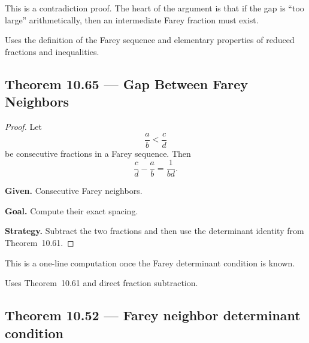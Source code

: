 \begin{remark*}
This is a contradiction proof.  The heart of the argument is that if the gap is
``too large'' arithmetically, then an intermediate Farey fraction must exist.
\end{remark*}

\begin{remark*}[Dependencies]
Uses the definition of the Farey sequence and elementary properties of reduced
fractions and inequalities.
\end{remark*}


\subsection*{Theorem 10.65 — Gap Between Farey Neighbors}
\label{prf:grep-farey-gap}

\begin{proof}
\Claim Let
\[
\frac{a}{b} < \frac{c}{d}
\]
be consecutive fractions in a Farey sequence. Then
\[
\frac{c}{d} - \frac{a}{b} = \frac{1}{bd}.
\]

\textbf{Given.} Consecutive Farey neighbors.

\textbf{Goal.} Compute their exact spacing.

\textbf{Strategy.} Subtract the two fractions and then use the determinant identity from Theorem~10.61.


\end{proof}

\begin{remark*}
This is a one-line computation once the Farey determinant condition is known.
\end{remark*}

\begin{remark*}[Dependencies]
Uses Theorem~10.61 and direct fraction subtraction.
\end{remark*}


\subsection*{Theorem 10.52 — Farey neighbor determinant condition}
\label{prf:grep-farey-neighbor-determinant-condition}

